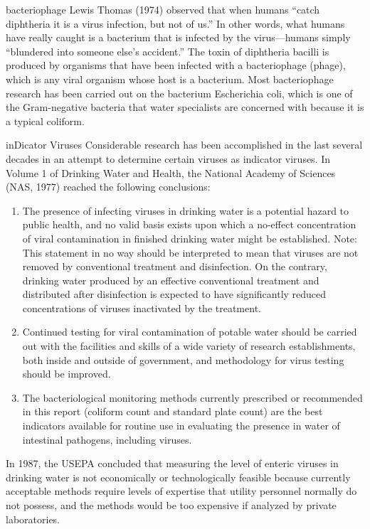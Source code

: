 \documentclass{article}
\begin{document}
bacteriophage Lewis Thomas (1974) observed that when humans ``catch
diphtheria it is a virus infection, but not of us.'' In other words,
what humans have really caught is a bacterium that is infected by the
virus---humans simply ``blundered into someone else's accident.'' The
toxin of diphtheria bacilli is produced by organisms that have been
infected with a bacteriophage (phage), which is any viral organism whose
host is a bacterium. Most bacteriophage research has been carried out on
the bacterium Escherichia coli, which is one of the Gram-negative
bacteria that water specialists are concerned with because it is a
typical coliform.

inDicator Viruses Considerable research has been accomplished in the
last several decades in an attempt to determine certain viruses as
indicator viruses. In Volume 1 of Drinking Water and Health, the
National Academy of Sciences (NAS, 1977) reached the following
conclusions:

\begin{enumerate}

\item
  The presence of infecting viruses in drinking water is a potential
  hazard to public health, and no valid basis exists upon which a
  no-effect concentration of viral contamination in finished drinking
  water might be established. Note: This statement in no way should be
  interpreted to mean that viruses are not removed by conventional
  treatment and disinfection. On the contrary, drinking water produced
  by an effective conventional treatment and distributed after
  disinfection is expected to have significantly reduced concentrations
  of viruses inactivated by the treatment.
\item
  Continued testing for viral contamination of potable water should be
  carried out with the facilities and skills of a wide variety of
  research establishments, both inside and outside of government, and
  methodology for virus testing should be improved.
\item
  The bacteriological monitoring methods currently prescribed or
  recommended in this report (coliform count and standard plate count)
  are the best indicators available for routine use in evaluating the
  presence in water of intestinal pathogens, including viruses.
\end{enumerate}

In 1987, the USEPA concluded that measuring the level of enteric viruses
in drinking water is not economically or technologically feasible
because currently acceptable methods require levels of expertise that
utility personnel normally do not possess, and the methods would be too
expensive if analyzed by private laboratories.
\end{document}
